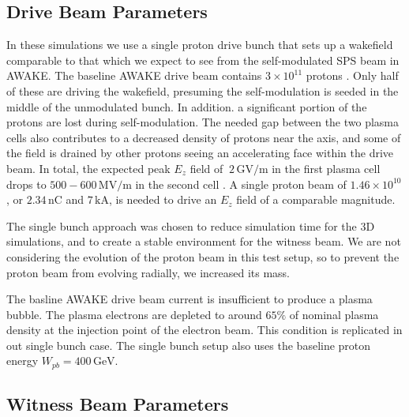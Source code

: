 \documentclass[aps,prstab,reprint,amsmath,amssymb,groupedaddress]{revtex4-1}
\newcommand{\unit}[1]{\,\mathrm{#1}}
\newcommand{\funit}[2]{\,\mathrm{#1}/\mathrm{#2}}
\newcommand{\nexp}[1]{\times 10^{#1}}
\begin{document}
\subsection[\label{S:M:Setup}]{Drive Beam Parameters}

In these simulations we use a single proton drive bunch that sets up a wakefield comparable to that which we expect to
see from the self-modulated SPS beam in AWAKE. The baseline AWAKE drive beam contains $3\nexp{11}$ protons
\cite{gschwendtner:2016}. Only half of these are driving the wakefield, presuming the self-modulation is seeded in the
middle of the unmodulated bunch. In addition. a significant portion of the protons are lost during self-modulation. The
needed gap between the two plasma cells also contributes to a decreased density of protons near the axis, and some of
the field is drained by other protons seeing an accelerating face within the drive beam. In total, the expected peak
$E_{z}$ field of $~2\funit{GV}{m}$ in the first plasma cell drops to $500-600\funit{MV}{m}$ in the second cell
\cite{awake_collaboration:2016}. A single proton beam of $1.46\nexp{10}$, or $2.34\unit{nC}$ and $7\unit{kA}$, is needed
to drive an $E_{z}$ field of a comparable magnitude.

The single bunch approach was chosen to reduce simulation time for the 3D simulations, and to create a stable
environment for the witness beam. We are not considering the evolution of the proton beam in this test setup, so to
prevent the proton beam from evolving radially, we increased its mass.

The basline AWAKE drive beam current is insufficient to produce a plasma bubble. The plasma electrons are depleted to
around $65\%$ of nominal plasma density at the injection point of the electron beam. This condition is replicated in out
single bunch case. The single bunch setup also uses the baseline proton energy $W_{pb} = 400\unit{GeV}$.

\subsection[\label{S:M:Setup}]{Witness Beam Parameters}
\end{document}

